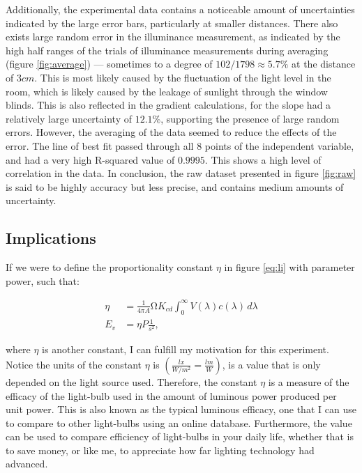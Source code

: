 \documentclass[a4paper,12pt]{article}
\begin{document}
Additionally, the experimental data contains a noticeable amount of uncertainties indicated by the large error bars, particularly at smaller distances. There also exists large random error in the illuminance measurement, as indicated by the high half ranges of the trials of illuminance measurements during averaging (figure \ref{fig:average}) --- sometimes to a degree of $102/1798 \approx 5.7\%$ at the distance of $3\si{cm}$. This is most likely caused by the fluctuation of the light level in the room, which is likely caused by the leakage of sunlight through the window blinds. This is also reflected in the gradient calculations, for the slope had a relatively large uncertainty of $12.1\%$, supporting the presence of large random errors. However, the averaging of the data seemed to reduce the effects of the error. The line of best fit passed through all 8 points of the independent variable, and had a very high R-squared value of $0.9995$. This shows a high level of correlation in the data. In conclusion, the raw dataset presented in figure \ref{fig:raw} is said to be highly accuracy but less precise, and contains medium amounts of uncertainty.

\subsection{Implications}

If we were to define the proportionality constant $\eta$ in figure \ref{eq:li} with parameter power, such that:

\begin{align*}
    \eta &= \frac{1}{4\pi A} \si{\ohm} K_{cd} \int_{0}^{\infty} V(\lambda) c(\lambda) \, d\lambda\\
    E_v &= \eta P \frac{1}{s^2},
\end{align*}

where $\eta$ is another constant, I can fulfill my motivation for this experiment. Notice the units of the constant $\eta$ is $(\frac{\si{lx}}{\si{W\per m^2}} = \frac{\si{lm}}{\si{W}})$, is a value that is only depended on the light source used. Therefore, the constant $\eta$ is a measure of the efficacy of the light-bulb used in the amount of luminous power produced per unit power. This is also known as the typical luminous efficacy, one that I can use to compare to other light-bulbs using an online database. Furthermore, the value can be used to compare efficiency of light-bulbs in your daily life, whether that is to save money, or like me, to appreciate how far lighting technology had advanced.
\end{document}
